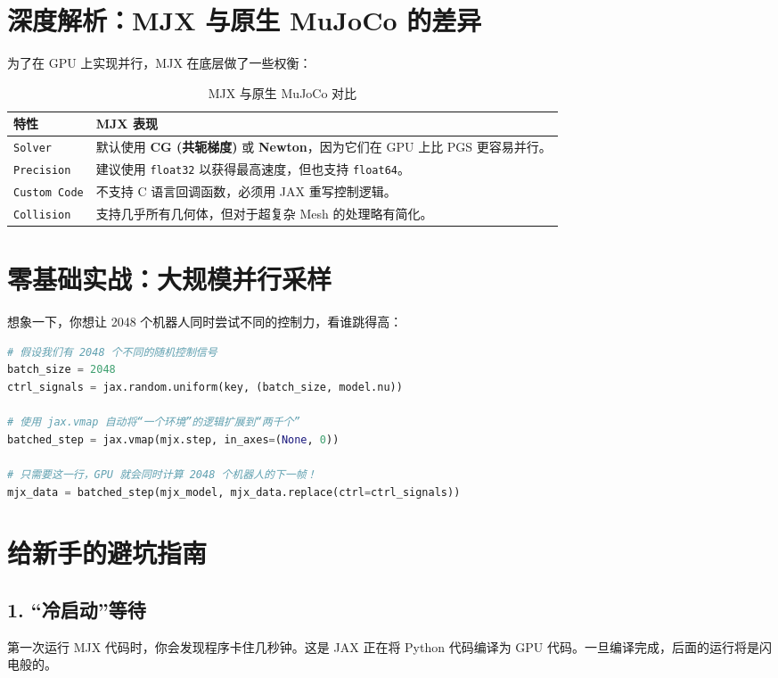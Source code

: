\documentclass[11pt,a4paper]{book}
\begin{document}
\section{深度解析：MJX 与原生 MuJoCo 的差异}

为了在 GPU 上实现并行，MJX 在底层做了一些权衡：

\begin{longtable}{lp{10cm}}
\caption{MJX 与原生 MuJoCo 对比} \\
\toprule
\textbf{特性} & \textbf{MJX 表现} \\ \midrule
\texttt{Solver} & 默认使用 \textbf{CG (共轭梯度)} 或 \textbf{Newton}，因为它们在 GPU 上比 PGS 更容易并行。 \\
\texttt{Precision} & 建议使用 \texttt{float32} 以获得最高速度，但也支持 \texttt{float64}。 \\
\texttt{Custom Code} & 不支持 C 语言回调函数，必须用 JAX 重写控制逻辑。 \\
\texttt{Collision} & 支持几乎所有几何体，但对于超复杂 Mesh 的处理略有简化。 \\
\bottomrule
\end{longtable}

\section{零基础实战：大规模并行采样}

想象一下，你想让 2048 个机器人同时尝试不同的控制力，看谁跳得高：

\begin{lstlisting}[language=Python, caption={2048 个环境并行仿真示例}]
# 假设我们有 2048 个不同的随机控制信号
batch_size = 2048
ctrl_signals = jax.random.uniform(key, (batch_size, model.nu))

# 使用 jax.vmap 自动将“一个环境”的逻辑扩展到“两千个”
batched_step = jax.vmap(mjx.step, in_axes=(None, 0))

# 只需要这一行，GPU 就会同时计算 2048 个机器人的下一帧！
mjx_data = batched_step(mjx_model, mjx_data.replace(ctrl=ctrl_signals))
\end{lstlisting}



\section{给新手的避坑指南}

\subsection{1. “冷启动”等待}
第一次运行 MJX 代码时，你会发现程序卡住几秒钟。这是 JAX 正在将 Python 代码编译为 GPU 代码。一旦编译完成，后面的运行将是闪电般的。
\end{document}
